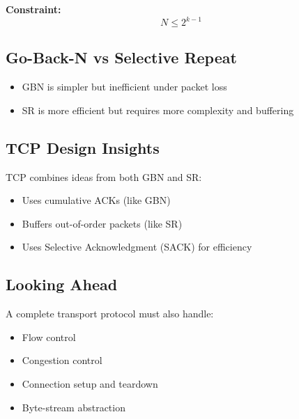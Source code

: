\textbf{Constraint:}
\[
N \leq 2^{k-1}
\]

\subsection{Go-Back-N vs Selective Repeat}
\begin{itemize}
    \item GBN is simpler but inefficient under packet loss
    \item SR is more efficient but requires more complexity and buffering
\end{itemize}

\subsection{TCP Design Insights}
TCP combines ideas from both GBN and SR:
\begin{itemize}
    \item Uses cumulative ACKs (like GBN)
    \item Buffers out-of-order packets (like SR)
    \item Uses Selective Acknowledgment (SACK) for efficiency
\end{itemize}

\subsection{Looking Ahead}
A complete transport protocol must also handle:
\begin{itemize}
    \item Flow control
    \item Congestion control
    \item Connection setup and teardown
    \item Byte-stream abstraction
\end{itemize}